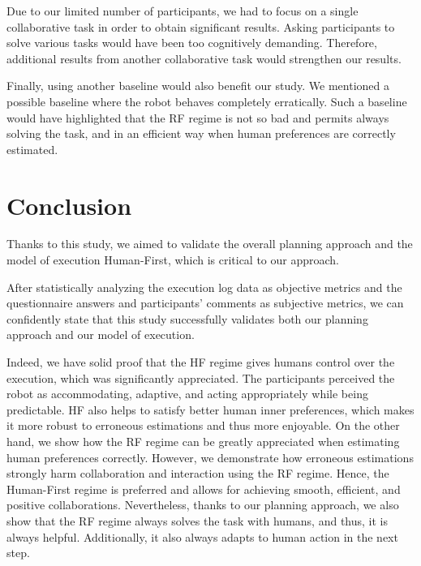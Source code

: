 Due to our limited number of participants, we had to focus on a single collaborative task in order to obtain significant results. Asking participants to solve various tasks would have been too cognitively demanding. Therefore, additional results from another collaborative task would strengthen our results. 

Finally, using another baseline would also benefit our study. We mentioned a possible baseline where the robot behaves completely erratically. Such a baseline would have highlighted that the RF regime is not so bad and permits always solving the task, and in an efficient way when human preferences are correctly estimated.

\section{Conclusion}

Thanks to this study, we aimed to validate the overall planning approach and the model of execution Human-First, which is critical to our approach. 

After statistically analyzing the execution log data as objective metrics and the questionnaire answers and participants' comments as subjective metrics, we can confidently state that this study successfully validates both our planning approach and our model of execution. 

Indeed, we have solid proof that the  HF regime gives humans control over the execution, which was significantly appreciated. The participants perceived the robot as accommodating, adaptive, and acting appropriately while being predictable. HF also helps to satisfy better human inner preferences, which makes it more robust to erroneous estimations and thus more enjoyable. 
On the other hand, we show how the RF regime can be greatly appreciated when estimating human preferences correctly. However, we demonstrate how erroneous estimations strongly harm collaboration and interaction using the RF regime. 
Hence, the Human-First regime is preferred and allows for achieving smooth, efficient, and positive collaborations.
Nevertheless, thanks to our planning approach, we also show that the RF regime always solves the task with humans, and thus, it is always helpful. Additionally, it also always adapts to human action in the next step. 
